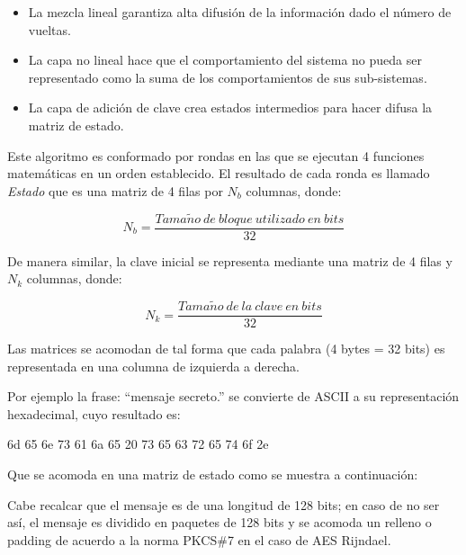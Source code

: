 \documentclass[../main/main.tex]{subfiles}
\begin{document}
    \begin{itemize}[noitemsep,nolistsep]
      \item La mezcla lineal garantiza alta difusión de la información dado el número de vueltas.
      \item La capa no lineal hace que el comportamiento del sistema no pueda ser representado como la suma de los comportamientos de sus sub-sistemas.
      \item La capa de adición de clave crea estados intermedios para hacer difusa la matriz de estado.
    \end{itemize}

    Este algoritmo es conformado por rondas en las que se ejecutan 4 funciones matemáticas en un orden establecido. El resultado de cada ronda es llamado \textit{Estado} que es una matriz de 4 filas por $N_b$ columnas, donde:

    \vspace{-0.7cm}\begin{equation}
      N_b = \frac{Tama\tilde{n}o\ de\ bloque\ utilizado\ en\ bits}{32}
    \end{equation}

    De manera similar, la clave inicial se representa mediante una matriz de 4 filas y $N_k$ columnas, donde:

    \vspace{-0.7cm}\begin{equation}
      N_k = \frac{Tama\tilde{n}o\ de\ la\ clave\ en\ bits}{32}
    \end{equation}
    
    Las matrices se acomodan de tal forma que cada palabra (4 bytes = 32 bits) es representada en una columna de izquierda a derecha.

    Por ejemplo la frase: ``mensaje secreto.'' se convierte de ASCII a su representación hexadecimal, cuyo resultado es:

    \begin{center}
      6d 65 6e 73 61 6a 65 20 73 65 63 72 65 74 6f 2e
    \end{center}

    Que se acomoda en una matriz de estado como se muestra a continuación:

    \begin{table}[H]
      \centering
      
    \end{table}

    Cabe recalcar que el mensaje es de una longitud de 128 bits; en caso de no ser así, el mensaje es dividido en paquetes de 128 bits y se acomoda un relleno o padding de acuerdo a la norma PKCS\#7 en el caso de AES Rijndael.
\end{document}
